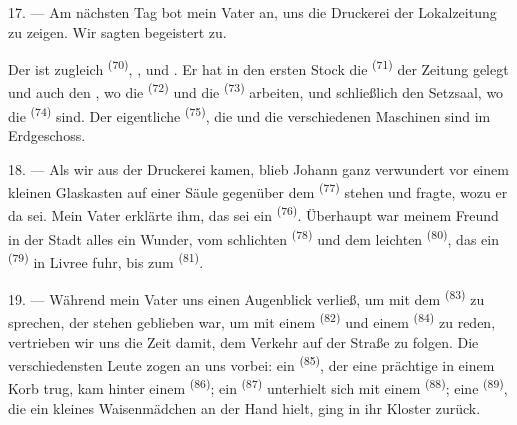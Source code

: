 \VUsaut{3.0mm}

17. --- Am nächsten Tag bot mein Vater an, uns die Druckerei der Lokalzeitung zu
zeigen. Wir sagten begeistert zu.

Der  ist zugleich  \textsuperscript{(70)},
,  und . Er hat in den
ersten Stock die  \textsuperscript{(71)} der Zeitung gelegt und auch
den , wo die  \textsuperscript{(72)} und die
 \textsuperscript{(73)} arbeiten, und schließlich den Setzsaal,
wo die  \textsuperscript{(74)} sind. Der eigentliche
 \textsuperscript{(75)}, die  und die
verschiedenen Maschinen sind im Erdgeschoss.

\VUsaut{3.0mm}

18. --- Als wir aus der Druckerei kamen, blieb Johann ganz verwundert vor einem
kleinen Glaskasten auf einer Säule gegenüber dem 
\textsuperscript{(77)} stehen und fragte, wozu er da sei. Mein Vater erklärte ihm,
das sei ein  \textsuperscript{(76)}. Überhaupt war meinem Freund
in der Stadt alles ein Wunder, vom schlichten 
\textsuperscript{(78)} und dem leichten 
\textsuperscript{(80)}, das ein  \textsuperscript{(79)} in Livree
fuhr, bis zum  \textsuperscript{(81)}.

19. --- Während mein Vater uns einen Augenblick verließ, um mit dem
 \textsuperscript{(83)} zu sprechen, der stehen geblieben war,
um mit einem  \textsuperscript{(82)} und einem 
\textsuperscript{(84)} zu reden, vertrieben wir uns die Zeit damit, dem Verkehr auf
der Straße zu folgen. Die verschiedensten Leute zogen an uns vorbei: ein
 \textsuperscript{(85)}, der eine prächtige 
in einem Korb trug, kam hinter einem 
\textsuperscript{(86)}; ein  \textsuperscript{(87)}
unterhielt sich mit einem  \textsuperscript{(88)}; eine
 \textsuperscript{(89)}, die ein kleines Waisenmädchen an der Hand
hielt, ging in ihr Kloster zurück.

\VUsaut{3.0mm}

